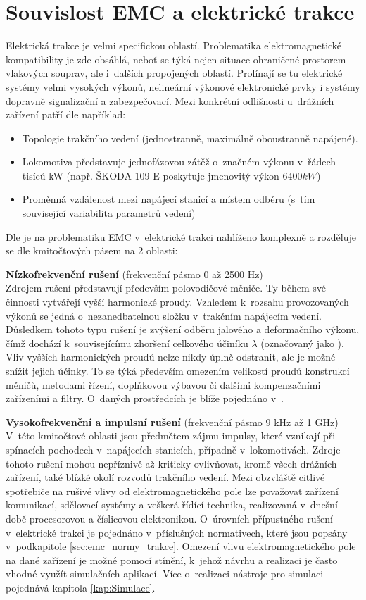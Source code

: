 \section{Souvislost EMC a elektrické trakce} \label{sec:emc_trakce}
Elektrická trakce je velmi specifickou oblastí. Problematika elektromagnetické kompatibility je zde obsáhlá, neboť se týká nejen situace ohraničené prostorem vlakových souprav, ale i~dalších propojených oblastí. Prolínají se tu elektrické systémy velmi vysokých výkonů, nelineární výkonové elektronické prvky i systémy dopravně signalizační a zabezpečovací. Mezi konkrétní odlišnosti u~drážních zařízení patří dle \cite{nfr} například:
\begin{itemize}
\item Topologie trakčního vedení (jednostranně, maximálně oboustranně napájené).
\item Lokomotiva představuje jednofázovou zátěž o~značném výkonu v~řádech tisíců kW (např. ŠKODA 109 E poskytuje jmenovitý výkon $6400 \unit{kW}$)
\item Proměnná vzdálenost mezi napájecí stanicí a místem odběru (s~tím související variabilita parametrů vedení)
\end{itemize}
Dle \cite{emc_trakce} je na problematiku EMC v~elektrické trakci nahlíženo komplexně a rozděluje se dle kmitočtových pásem na 2 oblasti:

\medskip
{\bf Nízkofrekvenční rušení} (frekvenční pásmo 0 až 2500 Hz) \\
Zdrojem rušení představují především polovodičové měniče. Ty během své činnosti vytvářejí vyšší harmonické proudy. Vzhledem k~rozsahu provozovaných výkonů se jedná o~nezanedbatelnou složku v~trakčním napájecím vedení. Důsledkem tohoto typu rušení je zvýšení odběru jalového a deformačního výkonu, čímž dochází k~souvisejícímu zhoršení celkového účiníku $\lambda$ (označovaný jako ). Vliv vyšších harmonických proudů nelze nikdy úplně odstranit, ale je možné snížit jejich účinky. To se týká především omezením velikostí proudů konstrukcí měničů, metodami řízení, doplňkovou výbavou či dalšími kompenzačními zařízeními a filtry. O~daných prostředcích je blíže pojednáno v~\cite{nfr}.

\medskip
{\bf Vysokofrekvenční a impulsní rušení} (frekvenční pásmo 9 kHz až 1 GHz) \\
V~této kmitočtové oblasti jsou předmětem zájmu impulsy, které vznikají při spínacích pochodech v~napájecích stanicích, případně v~lokomotivách. Zdroje tohoto rušení mohou nepříznivě až kriticky ovlivňovat, kromě všech drážních zařízení, také blízké okolí rozvodů trakčního vedení. Mezi obzvláště citlivé spotřebiče na rušivé vlivy od elektromagnetického pole lze považovat zařízení komunikací, sdělovací systémy a veškerá řídící technika, realizovaná v~dnešní době procesorovou a číslicovou elektronikou. O~úrovních přípustného rušení v~elektrické trakci je pojednáno v~příslušných normativech, které jsou popsány v~podkapitole \ref{sec:emc_normy_trakce}. Omezení vlivu elektromagnetického pole na dané zařízení je možné pomocí stínění, k~jehož návrhu a realizaci je často vhodné využít simulačních aplikací. Více o~realizaci nástroje pro simulaci pojednává kapitola \ref{kap:Simulace}.
\newpage

